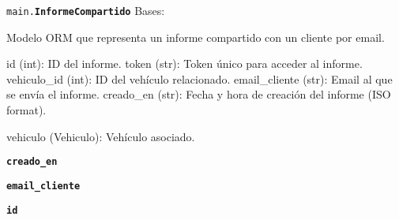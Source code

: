 \documentclass[a4paper,11pt,spanish]{sphinxmanual}
\newcommand{\robotoMonoBold}{\fontseries{b}\selectfont\ttfamily}
\renewcommand{\sphinxcode}[1]{\textcolor{sphinxorangeCode}{{\robotoMonoBold #1}}}
\renewcommand{\sphinxbfcode}[1]{\textbf{\sphinxcode{#1}}}
\renewcommand{\sphinxupquote}[1]{\texttt{#1}}
\begin{document}
\begin{fulllineitems}
\label{\detokenize{modelos:main.InformeCompartido}}
\pysigstartsignatures
\pysiglinewithargsret
{\sphinxbfcode{\sphinxupquote{}}\sphinxcode{\sphinxupquote{main.}}\sphinxbfcode{\sphinxupquote{InformeCompartido}}}
{}
{}
\pysigstopsignatures
\sphinxAtStartPar
Bases: {\hyperref[\detokenize{modelos:main.Base}]{\sphinxcrossref{\sphinxcode{\sphinxupquote{Base}}}}}

\sphinxAtStartPar
Modelo ORM que representa un informe compartido con un cliente por email.
\begin{description}
\sphinxAtStartPar
id (int): ID del informe.
token (str): Token único para acceder al informe.
vehiculo\_id (int): ID del vehículo relacionado.
email\_cliente (str): Email al que se envía el informe.
creado\_en (str): Fecha y hora de creación del informe (ISO format).

\sphinxAtStartPar
vehiculo (Vehiculo): Vehículo asociado.

\end{description}

\begin{fulllineitems}
\label{\detokenize{modelos:main.InformeCompartido.creado_en}}
\pysigstartsignatures
\pysigline
{\sphinxbfcode{\sphinxupquote{creado\_en}}}
\pysigstopsignatures
\end{fulllineitems}


\begin{fulllineitems}
\label{\detokenize{modelos:main.InformeCompartido.email_cliente}}
\pysigstartsignatures
\pysigline
{\sphinxbfcode{\sphinxupquote{email\_cliente}}}
\pysigstopsignatures
\end{fulllineitems}


\begin{fulllineitems}
\label{\detokenize{modelos:main.InformeCompartido.id}}
\pysigstartsignatures
\pysigline
{\sphinxbfcode{\sphinxupquote{id}}}
\pysigstopsignatures
\end{fulllineitems}


\end{fulllineitems}
\end{document}
